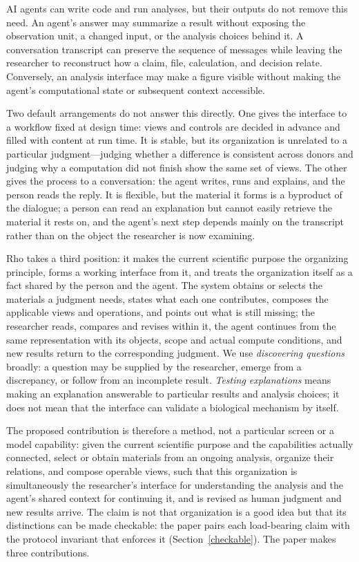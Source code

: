 \documentclass[11pt]{article}
\begin{document}
AI agents can write code and run analyses, but their outputs do not remove this need. An agent's answer may summarize a result without exposing the observation unit, a changed input, or the analysis choices behind it. A conversation transcript can preserve the sequence of messages while leaving the researcher to reconstruct how a claim, file, calculation, and decision relate. Conversely, an analysis interface may make a figure visible without making the agent's computational state or subsequent context accessible.

Two default arrangements do not answer this directly. One gives the interface to a workflow fixed at design time: views and controls are decided in advance and filled with content at run time. It is stable, but its organization is unrelated to a particular judgment---judging whether a difference is consistent across donors and judging why a computation did not finish show the same set of views. The other gives the process to a conversation: the agent writes, runs and explains, and the person reads the reply. It is flexible, but the material it forms is a byproduct of the dialogue; a person can read an explanation but cannot easily retrieve the material it rests on, and the agent's next step depends mainly on the transcript rather than on the object the researcher is now examining.

Rho takes a third position: it makes the current scientific purpose the organizing principle, forms a working interface from it, and treats the organization itself as a fact shared by the person and the agent. The system obtains or selects the materials a judgment needs, states what each one contributes, composes the applicable views and operations, and points out what is still missing; the researcher reads, compares and revises within it, the agent continues from the same representation with its objects, scope and actual compute conditions, and new results return to the corresponding judgment. We use \emph{discovering questions} broadly: a question may be supplied by the researcher, emerge from a discrepancy, or follow from an incomplete result. \emph{Testing explanations} means making an explanation answerable to particular results and analysis choices; it does not mean that the interface can validate a biological mechanism by itself.

The proposed contribution is therefore a method, not a particular screen or a model capability: given the current scientific purpose and the capabilities actually connected, select or obtain materials from an ongoing analysis, organize their relations, and compose operable views, such that this organization is simultaneously the researcher's interface for understanding the analysis and the agent's shared context for continuing it, and is revised as human judgment and new results arrive. The claim is not that organization is a good idea but that its distinctions can be made checkable: the paper pairs each load-bearing claim with the protocol invariant that enforces it (Section~\ref{checkable}). The paper makes three contributions.
\end{document}
